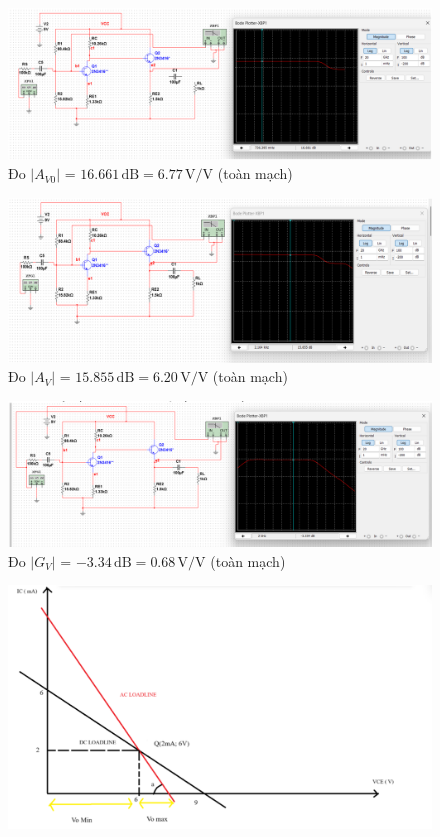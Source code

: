 \begin{itemize}[label=-]
	\begin{figure}[H]
		\centering
		\includegraphics[width=.8\linewidth]{./my-chapters/my-images/Question9/b_avo_toan.png}
		\caption{Đo \(|A_{V0}|\) = \(16.661\,\text{dB} = 6.77\,\text{V/V}\) (toàn mạch)}
	\end{figure}
	
	\begin{figure}[H]
		\centering
		\includegraphics[width=.8\linewidth]{./my-chapters/my-images/Question9/b_av_toan.png}
		\caption{Đo \(|A_{V}|\) = \(15.855\,\text{dB} = 6.20\,\text{V/V}\) (toàn mạch)}
	\end{figure}
	
	\begin{figure}[H]
		\centering
		\includegraphics[width=.8\linewidth]{./my-chapters/my-images/Question9/b_gv_toan.png}
		\caption{Đo \(|G_{V}|\) = \(-3.34\,\text{dB} = 0.68\,\text{V/V}\) (toàn mạch)}
	\end{figure}
\end{itemize}


\begin{figure}[H]
	\centering
	\includegraphics[width=.8\linewidth]{./my-chapters/my-images/Question9/c_dcloadline.png}
\end{figure}

